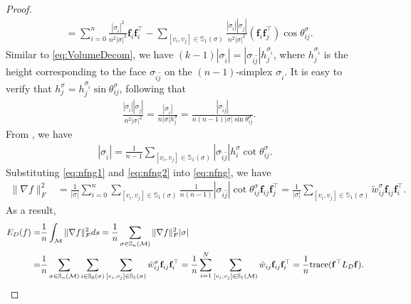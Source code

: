\documentclass{article}
\begin{document}
\begin{proof}
\begin{align}
    &=
    \sum_{i = 0}^n \frac{|\sigma_{\hat{i}}|^2}{n^2|\sigma|^2} \mathbf{f}_{i}\mathbf{f}_{i}^\top
    - \sum_{[v_i,v_j]\in\mathbb{S}_{1}(\sigma)} \frac{|\sigma_{\hat{i}}||\sigma_{\hat{j}}|}{n^2|\sigma|^2} (\mathbf{f}_{i}\mathbf{f}_{j}^\top) \cos\theta_{ij}^\sigma. \label{eq:nfng}
\end{align}
Similar to \eqref{eq:VolumeDecom}, we have $(k-1)|\sigma_{\hat{i}}| = |\sigma_{\hat{i}\hat{j}}| h_j^{\sigma_{\hat{i}}}$, where $h_j^{\sigma_{\hat{i}}}$ is the height corresponding to the face $\sigma_{\hat{i}\hat{j}}$ on the $(n-1)$-simplex $\sigma_{\hat{i}}$. It is easy to verify that $ h_j^{\sigma} = h_j^{\sigma_{\hat{i}}} \sin\theta_{ij}^\sigma$, following that
\begin{align} \label{eq:nfng1}
    &\frac{|\sigma_{\hat{i}}||\sigma_{\hat{j}}|}{n^2|\sigma|^2}
    = \frac{|\sigma_{\hat{i}}|}{n|\sigma|h_j^{\sigma}}
    = \frac{|\sigma_{\hat{i}\hat{j}}|}{n(n-1)|\sigma|\sin\theta_{ij}^\sigma}.
\end{align}
From \cite{Crane19}, we have
\begin{align} \label{eq:nfng2}
|\sigma_{\hat{i}}| = \frac{1}{n-1}\sum_{[v_i,v_j]\in\mathbb{S}_{1}(\sigma)} |\sigma_{\hat{i}\hat{j}}| h_i^{\sigma} \cot\theta_{ij}^\sigma.
\end{align}
Substituting \eqref{eq:nfng1} and \eqref{eq:nfng2} into \eqref{eq:nfng}, we have
\begin{align}
    \|\nabla f\|_F^2 &= \frac{1}{|\sigma|} \sum_{i = 0}^n \sum_{[v_i,v_j]\in \mathbb{S}_1(\sigma)} \frac{1}{n(n-1)} |\sigma_{\hat{i}\hat{j}}| \cot\theta_{ij}^\sigma \mathbf{f}_{ij} \mathbf{f}_j^\top
    = \frac{1}{|\sigma|} \sum_{[v_i,v_j]\in \mathbb{S}_1(\sigma)} \tilde{w}_{ij}^\sigma \mathbf{f}_{ij} \mathbf{f}_i^\top.
\end{align}
As a result,
\begin{align}
    E_D(f) =& \frac{1}{n} \int_{\mathcal{M}}\|\nabla f\|_F^2 ds
    = \frac{1}{n} \sum_{\sigma\in \mathbb{S}_n(\mathcal{M})} \|\nabla f\|_F^2 |\sigma|\\
    =& \frac{1}{n} \sum_{\sigma\in \mathbb{S}_n(\mathcal{M})}\sum_{i\in \mathbb{S}_0(\sigma)} \sum_{[v_i,v_j]\in \mathbb{S}_1(\sigma)} \tilde{w}_{ij}^\sigma \mathbf{f}_{ij} \mathbf{f}_i^\top
    = \frac{1}{n} \sum_{i = 1}^N \sum_{[v_i,v_j]\in \mathbb{S}_1(\mathcal{M})} \tilde{w}_{ij} \mathbf{f}_{ij} \mathbf{f}_i^\top
    = \frac{1}{n} \mathrm{trace}(\mathbf{f}^\top L_D \mathbf{f}).
\end{align}
\end{proof}
\end{document}

